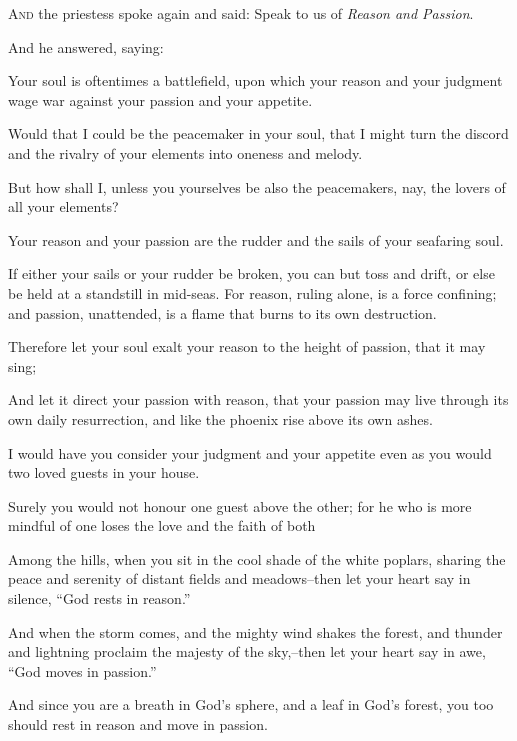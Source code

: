 \lettrine{A}{nd} the priestess spoke again
and said: Speak to us of \textit{Reason and
Passion}.

And he answered, saying:

Your soul is oftentimes a battlefield,
upon which your reason and your judgment
wage war against your passion and your
appetite.

Would that I could be the peacemaker in
your soul, that I might turn the discord
and the rivalry of your elements into
oneness and melody.

But how shall I, unless you yourselves
be also the peacemakers, nay, the lovers
of all your elements?

Your reason and your passion are the
rudder and the sails of your seafaring
soul.

If either your sails or your rudder be
broken, you can but toss and drift,
or else be held at a standstill in
mid-seas. For reason, ruling alone,
is a force confining; and passion,
unattended, is a flame that burns to its
own destruction.

Therefore let your soul exalt your
reason to the height of passion, that it
may sing;

And let it direct your passion with
reason, that your passion may live
through its own daily resurrection,
and like the phoenix rise above its own
ashes.


I would have you consider your judgment
and your appetite even as you would two
loved guests in your house.

Surely you would not honour one guest
above the other; for he who is more
mindful of one loses the love and the
faith of both

Among the hills, when you sit in the
cool shade of the white poplars, sharing
the peace and serenity of distant fields
and meadows--then let your heart say in
silence, \enquote{God rests in reason.}

And when the storm comes, and the
mighty wind shakes the forest,
and thunder and lightning proclaim the
majesty of the sky,--then let your heart
say in awe, \enquote{God moves in passion.}

And since you are a breath in God’s
sphere, and a leaf in God’s forest, you
too should rest in reason and move in
passion.
